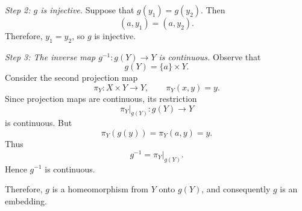 \emph{Step 2: $g$ is injective.}
Suppose that $g(y_1)=g(y_2)$. Then
\[ (a,y_1)=(a,y_2). \]
Therefore, $y_1=y_2$, so $g$ is injective.

\emph{Step 3: The inverse map $g^{-1}\colon g(Y)\to Y$ is continuous.}
Observe that
\[ g(Y)=\{a\}\times Y. \]
Consider the second projection map
\[ \pi_Y\colon X\times Y\to Y,\qquad \pi_Y(x,y)=y. \]
Since projection maps are continuous, its restriction
\[ \pi_Y|_{g(Y)}\colon g(Y)\to Y \]
is continuous. But
\[ \pi_Y(g(y))=\pi_Y(a,y)=y. \]
Thus
\[ g^{-1}=\pi_Y|_{g(Y)}. \]
Hence $g^{-1}$ is continuous.

Therefore, $g$ is a homeomorphism from $Y$ onto $g(Y)$, and consequently $g$ is an embedding.

\begin{center}
\end{center}
